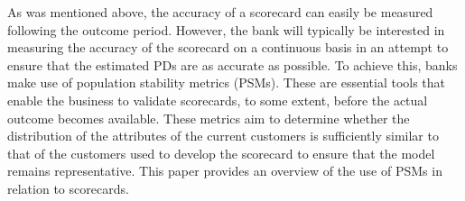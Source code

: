 \documentclass{article}
\theoremstyle{def}
\begin{document}

As was mentioned above, the accuracy of a scorecard can easily be measured following the outcome period. However, the bank will typically be interested in measuring the accuracy of the scorecard on a continuous basis in an attempt to ensure that the estimated PDs are as accurate as possible. To achieve this, banks make use of population stability metrics (PSMs). These are essential tools that enable the business to validate scorecards, to some extent, before the actual outcome becomes available. These metrics aim to determine whether the distribution of the attributes of the current customers
is sufficiently similar to that of the customers used to develop the scorecard to ensure that the model remains representative. This paper provides an overview of the use of PSMs in relation to scorecards.


\newpage
\end{document}
